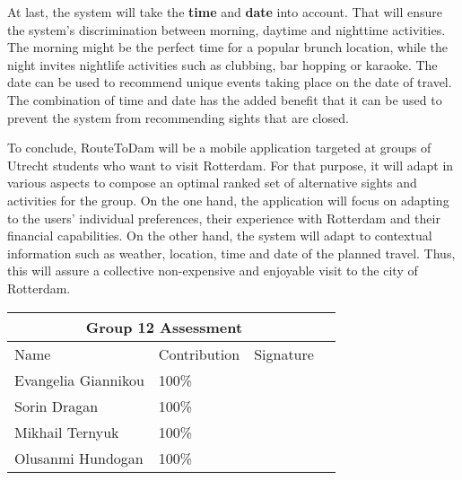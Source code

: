 \documentclass[11pt,a4paper,oneside]{article}
\begin{document}
At last, the system will take the \textbf{time} and \textbf{date} into account. That will ensure the system's discrimination between morning, daytime and nighttime activities. The morning might be the perfect time for a popular brunch location, while the night invites nightlife activities such as clubbing, bar hopping or karaoke. The date can be used to recommend unique events taking place on the date of travel. The combination of time and date has the added benefit that it can be used to prevent the system from recommending sights that are closed.  

To conclude, RouteToDam will be a mobile application targeted at groups of Utrecht students who want to visit Rotterdam. For that purpose, it will adapt in various aspects to compose an optimal ranked set of alternative sights and activities for the group. On the one hand, the application will focus on adapting to the users' individual preferences, their experience with Rotterdam and their financial capabilities. On the other hand, the system will adapt to contextual information such as weather, location, time and date of the planned travel. Thus, this will assure a collective non-expensive and enjoyable visit to the city of Rotterdam. 

\clearpage 
\printbibliography

\clearpage
\Large
\begin{tabularx}{\textwidth}{|X|X|X|X|}
\hline
\multicolumn{3}{|c|}{Group 12 Assessment}    \\ \hline
Name                & Contribution & Signature \\ \hline
\hline
Evangelia Giannikou & 100\%        &           \\ \hline
Sorin Dragan        & 100\%        &           \\ \hline
Mikhail Ternyuk     & 100\%        &           \\ \hline
Olusanmi Hundogan   & 100\%        &           \\ \hline
\end{tabularx}
\end{document}
